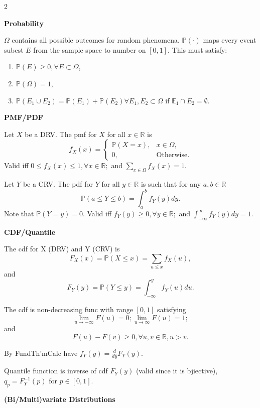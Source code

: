 \documentclass[10pt]{extarticle}
\theoremstyle{definition}
\theoremstyle{remark}
\newcommand{\R}{\mathbb{R}}
\newcommand{\pf}{\mathbb{P}}
\newcommand{\E}{\mathbb{E}}
\begin{document}
\begin{multicols}{2}


    \noindent
    {\large\textbf{Probability}}

    $\Omega$ contains all possible outcomes for random phenomena. 
    $\pf(\cdot)$ maps every event subest $E$ from the sample space to 
    number on $[0, 1]$. This must satisfy: 
    \begin{enumerate}
        \item $\pf(E) \geq 0, \forall E \subset \Omega$,
        \item $\pf(\Omega) = 1$,
        \item $\pf(E_1 \cup E_2) = \pf(E_1) + \pf(E_2) \forall E_1,E_2
            \subset \Omega$ if $\E_1 \cap E_2 = \emptyset$.
    \end{enumerate}

    \noindent
    \textbf{PMF/PDF}
    
    Let $X$ be a DRV. The pmf for $X$ for all $x \in \R$ is \[ 
        f_X(x) = 
        \begin{cases} 
            \pf(X = x), & x \in \Omega, \\
            0, & \text{Otherwise.}
        \end{cases}
    \]
    Valid iff $0 \leq f_X(x) \leq 1, \forall x \in \R;$ and $\sum_{x \in
    \Omega} f_X(x) = 1.$
    
    Let $Y$ be a CRV. The pdf for $Y$ for all $y \in \R$ is such that for any 
    $a, b \in \R$ \[
        \pf(a \leq Y \leq b) = \int_a^b f_Y(y) dy.
    \]
    Note that $\pf(Y=y)=0$.
    Valid iff $f_Y(y) \geq 0, \forall y \in \R;$ and
    $\int_{-\infty}^{\infty}f_Y(y)dy = 1.$

    \noindent
    \textbf{CDF/Quantile}

    The cdf for X (DRV) and Y (CRV) is
    $$F_X(x) = \pf(X \leq x) = \sum_{u \leq x} f_X(u),$$ and 
    $$F_Y(y) = \pf(Y \leq y) = \int_{- \infty}^y f_Y(u) du.$$

    The cdf is non-decreasing func with range $[0,1]$ satisfying 
    $$\lim_{u \to -\infty} F(u) = 0; \lim_{u \to \infty} F(u) = 1;$$ and 
    $$F(u) - F(v) \geq 0, \forall u, v \in \R, u > v.$$

    By FundTh'mCalc have $f_Y(y) = \frac{d}{dy}F_Y(y).$

    Quantile function is inverse of cdf $F_Y(y)$ (valid since it is bjiective),
    $q_p = F_Y^{-1}(p)$ for $p \in [0,1]$.

    \noindent
    \textbf{(Bi/Multi)variate Distributions}


\end{multicols}
\end{document}

